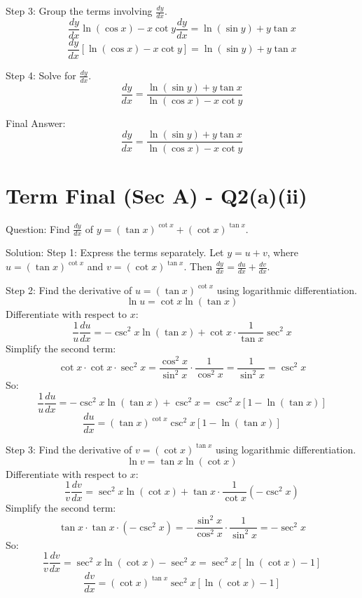 \documentclass{article}
\begin{document}
Step 3: Group the terms involving $\frac{dy}{dx}$.
\[
\frac{dy}{dx} \ln(\cos x) - x \cot y \frac{dy}{dx} = \ln(\sin y) + y \tan x
\]
\[
\frac{dy}{dx} \left[ \ln(\cos x) - x \cot y \right] = \ln(\sin y) + y \tan x
\]

Step 4: Solve for $\frac{dy}{dx}$.
\[
\frac{dy}{dx} = \frac{\ln(\sin y) + y \tan x}{\ln(\cos x) - x \cot y}
\]

Final Answer:
\[
\boxed{\frac{dy}{dx} = \frac{\ln(\sin y) + y \tan x}{\ln(\cos x) - x \cot y}}
\]

\section*{Term Final (Sec A) - Q2(a)(ii)}
Question:
Find $\frac{dy}{dx}$ of $y = (\tan x)^{\cot x} + (\cot x)^{\tan x}$.

Solution:
Step 1: Express the terms separately.
Let $y = u + v$, where $u = (\tan x)^{\cot x}$ and $v = (\cot x)^{\tan x}$. Then $\frac{dy}{dx} = \frac{du}{dx} + \frac{dv}{dx}$.

Step 2: Find the derivative of $u = (\tan x)^{\cot x}$ using logarithmic differentiation.
\[
\ln u = \cot x \ln(\tan x)
\]
Differentiate with respect to $x$:
\[
\frac{1}{u} \frac{du}{dx} = -\csc^2 x \ln(\tan x) + \cot x \cdot \frac{1}{\tan x} \sec^2 x
\]
Simplify the second term:
\[
\cot x \cdot \cot x \cdot \sec^2 x = \frac{\cos^2 x}{\sin^2 x} \cdot \frac{1}{\cos^2 x} = \frac{1}{\sin^2 x} = \csc^2 x
\]
So:
\[
\frac{1}{u} \frac{du}{dx} = -\csc^2 x \ln(\tan x) + \csc^2 x = \csc^2 x [1 - \ln(\tan x)]
\]
\[
\frac{du}{dx} = (\tan x)^{\cot x} \csc^2 x [1 - \ln(\tan x)]
\]

Step 3: Find the derivative of $v = (\cot x)^{\tan x}$ using logarithmic differentiation.
\[
\ln v = \tan x \ln(\cot x)
\]
Differentiate with respect to $x$:
\[
\frac{1}{v} \frac{dv}{dx} = \sec^2 x \ln(\cot x) + \tan x \cdot \frac{1}{\cot x} (-\csc^2 x)
\]
Simplify the second term:
\[
\tan x \cdot \tan x \cdot (-\csc^2 x) = -\frac{\sin^2 x}{\cos^2 x} \cdot \frac{1}{\sin^2 x} = -\sec^2 x
\]
So:
\[
\frac{1}{v} \frac{dv}{dx} = \sec^2 x \ln(\cot x) - \sec^2 x = \sec^2 x [\ln(\cot x) - 1]
\]
\[
\frac{dv}{dx} = (\cot x)^{\tan x} \sec^2 x [\ln(\cot x) - 1]
\]
\end{document}
